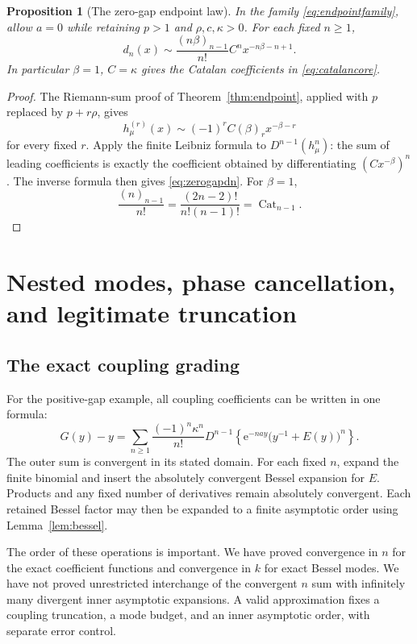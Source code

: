 \documentclass[11pt,a4paper]{article}
\newtheorem{proposition}[theorem]{Proposition}
\theoremstyle{definition}
\theoremstyle{remark}
\newcommand{\e}{\mathrm e}
\newcommand{\rise}[2]{(#1)_{#2}}
\numberwithin{equation}{section}
\begin{document}
\begin{proposition}[The zero-gap endpoint law]\label{prop:zerogapleading}
In the family \eqref{eq:endpointfamily}, allow $a=0$ while retaining $p>1$ and $\rho,c,\kappa>0$. For each fixed $n\ge1$,
\begin{equation}\label{eq:zerogapdn}
 d_n(x)\sim\frac{\rise{n\beta}{n-1}}{n!}
                C^n x^{-n\beta-n+1}.
\end{equation}
In particular $\beta=1$, $C=\kappa$ gives the Catalan coefficients in \eqref{eq:catalancore}.
\end{proposition}
\begin{proof}
The Riemann-sum proof of Theorem~\ref{thm:endpoint}, applied with $p$ replaced by $p+r\rho$, gives
\[
 h_\mu^{(r)}(x)\sim(-1)^r C\rise{\beta}{r}x^{-\beta-r}
\]
for every fixed $r$. Apply the finite Leibniz formula to $D^{n-1}(h_\mu^n)$: the sum of leading coefficients is exactly the coefficient obtained by differentiating $(Cx^{-\beta})^n$. The inverse formula then gives \eqref{eq:zerogapdn}. For $\beta=1$,
\[
 \frac{\rise n{n-1}}{n!}
 =\frac{(2n-2)!}{n!(n-1)!}=\operatorname{Cat}_{n-1}.
\]
\end{proof}

\section{Nested modes, phase cancellation, and legitimate truncation}\label{sec:nested}

\subsection{The exact coupling grading}
For the positive-gap example, all coupling coefficients can be written in one formula:
\begin{equation}\label{eq:nestedexact}
 G(y)-y=\sum_{n\ge1}\frac{(-1)^n\kappa^n}{n!}
 D^{n-1}\left\{\e^{-nay}\bigl(y^{-1}+E(y)\bigr)^n\right\}.
\end{equation}
The outer sum is convergent in its stated domain. For each fixed $n$, expand the finite binomial and insert the absolutely convergent Bessel expansion for $E$. Products and any fixed number of derivatives remain absolutely convergent. Each retained Bessel factor may then be expanded to a finite asymptotic order using Lemma~\ref{lem:bessel}.

The order of these operations is important. We have proved convergence in $n$ for the exact coefficient functions and convergence in $k$ for exact Bessel modes. We have not proved unrestricted interchange of the convergent $n$ sum with infinitely many divergent inner asymptotic expansions. A valid approximation fixes a coupling truncation, a mode budget, and an inner asymptotic order, with separate error control.
\end{document}
